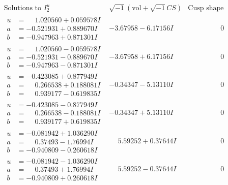 \documentclass[1p]{elsarticle_modified}
\theoremstyle{definition}
\newcommand{\I}{\sqrt{-1}}
\begin{document}
$$\begin{array}{c|c|c}  
\text{Solutions to }I^u_{2}& \I (\text{vol} + \sqrt{-1}CS) & \text{Cusp shape}\\
 \hline 
\begin{aligned}
u &= \phantom{-}1.020560 + 0.059578 I \\
a &= -0.521931 + 0.889670 I \\
b &= -0.947963 + 0.871301 I\end{aligned}
 & -3.67958 - 6.17156 I & \phantom{-0.000000 } 0 \\ \hline\begin{aligned}
u &= \phantom{-}1.020560 - 0.059578 I \\
a &= -0.521931 - 0.889670 I \\
b &= -0.947963 - 0.871301 I\end{aligned}
 & -3.67958 + 6.17156 I & \phantom{-0.000000 } 0 \\ \hline\begin{aligned}
u &= -0.423085 + 0.877949 I \\
a &= \phantom{-}0.266538 + 0.188081 I \\
b &= \phantom{-}0.939177 - 0.619835 I\end{aligned}
 & -0.34347 - 5.13110 I & \phantom{-0.000000 } 0 \\ \hline\begin{aligned}
u &= -0.423085 - 0.877949 I \\
a &= \phantom{-}0.266538 - 0.188081 I \\
b &= \phantom{-}0.939177 + 0.619835 I\end{aligned}
 & -0.34347 + 5.13110 I & \phantom{-0.000000 } 0 \\ \hline\begin{aligned}
u &= -0.081942 + 1.036290 I \\
a &= \phantom{-}0.37493 - 1.76994 I \\
b &= -0.940809 - 0.260618 I\end{aligned}
 & \phantom{-}5.59252 + 0.37644 I & \phantom{-0.000000 } 0 \\ \hline\begin{aligned}
u &= -0.081942 - 1.036290 I \\
a &= \phantom{-}0.37493 + 1.76994 I \\
b &= -0.940809 + 0.260618 I\end{aligned}
 & \phantom{-}5.59252 - 0.37644 I & \phantom{-0.000000 } 0 \\ \hline\begin{aligned}

\end{aligned}
\end{array}$$
\end{document}
